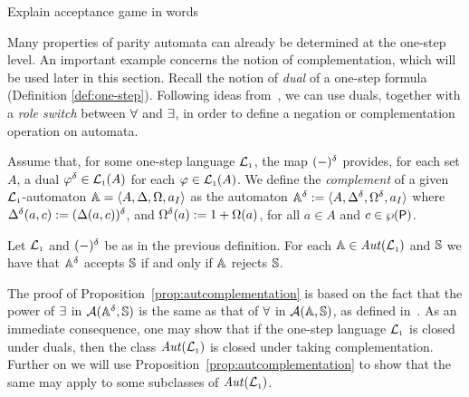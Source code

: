 \btbs
\item
Explain acceptance game in words
\etbs

Many properties of parity automata can already be determined at the one-step
level.
An important example concerns the notion of complementation, which will be used
later in this section. Recall the notion of \emph{dual} of a one-step formula (Definition \ref{def:one-step}). Following ideas from~\cite{Muller1987,DBLP:conf/calco/KissigV09}, we can use duals, together with a \emph{role switch} between $\forall$ and
$\exists$, in order to define a negation or complementation operation on 
automata.




\begin{definition}
\label{d:caut}
Assume that, for some one-step language $\mathcal{L}_{\scriptscriptstyle 1}$, the map $(-)^{\delta}$
provides, for each set $A$, a dual $\varphi^{\delta} \in \mathcal{L}_{\scriptscriptstyle 1}(A)$ for each
$\varphi \in \mathcal{L}_{\scriptscriptstyle 1}(A)$.
We define the \emph{complement} of a given $\mathcal{L}_{\scriptscriptstyle 1}$-automaton 
$\mathbb{A} = \langle{A,\Delta,\Omega,a_I}\rangle$ as the automaton $\mathbb{A}^{\delta} \mathrel{:=} 
\langle{A,\Delta^{\delta},\Omega^{\delta},a_I}\rangle$ where $\Delta^{\delta}(a,c) \mathrel{:=}
(\Delta(a,c))^{\delta}$, and $\Omega^{\delta}(a) \mathrel{:=} 1 + \Omega(a)$, for all 
$a \in A$ and $c \in \wp(\mathsf{P})$.
\end{definition}

\begin{proposition}
\label{prop:autcomplementation}
Let $\mathcal{L}_{\scriptscriptstyle 1}$ and $(-)^{\delta}$ be as in the previous definition.
For each $\mathbb{A} \in \mathit{Aut}(\mathcal{L}_{\scriptscriptstyle 1})$ and $\mathbb{S}$ we have that $\mathbb{A}^{\delta}$ accepts
$\mathbb{S}$ if and only if $\mathbb{A}$ rejects $\mathbb{S}$.
\end{proposition}

The proof of Proposition~\ref{prop:autcomplementation} is based on the fact
that the power of $\exists$ in $\mathcal{A}(\mathbb{A}^{\delta},\mathbb{S})$ is the same
as that of $\forall$ in $\mathcal{A}(\mathbb{A},\mathbb{S})$, as defined 
in~\cite{DBLP:conf/calco/KissigV09}. 
As an immediate consequence, one may show that if the one-step language $\mathcal{L}_{\scriptscriptstyle 1}$
is closed under duals, then the class $\mathit{Aut}(\mathcal{L}_{\scriptscriptstyle 1})$ is closed under 
taking complementation.
Further on we will use Proposition~\ref{prop:autcomplementation} to show that
the same may apply to some subclasses of $\mathit{Aut}(\mathcal{L}_{\scriptscriptstyle 1})$.

